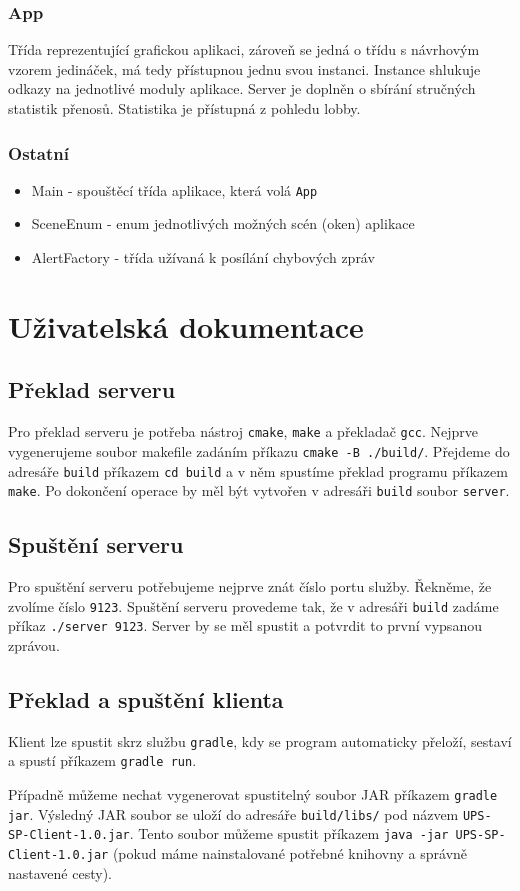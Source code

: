 \documentclass[12pt, a4paper]{article} %
\begin{document}
	\subsubsection{App}
	\par Třída reprezentující grafickou aplikaci, zároveň se jedná o třídu s návrhovým vzorem jedináček, má tedy přístupnou jednu svou instanci. Instance shlukuje odkazy na jednotlivé moduly aplikace. Server je doplněn o sbírání stručných statistik přenosů. Statistika je přístupná z pohledu lobby.
	
	\subsubsection{Ostatní}
	\begin{itemize}
		\item Main - spouštěcí třída aplikace, která volá \texttt{App}
		\item SceneEnum - enum jednotlivých možných scén (oken) aplikace
		\item AlertFactory - třída užívaná k posílání chybových zpráv
	\end{itemize}
	
	\section{Uživatelská dokumentace}
	\subsection{Překlad serveru}
	\par Pro překlad serveru je potřeba nástroj \texttt{cmake}, \texttt{make} a překladač \texttt{gcc}. Nejprve vygenerujeme soubor makefile zadáním příkazu \texttt{cmake -B ./build/}. Přejdeme do adresáře \texttt{build} příkazem \texttt{cd build} a v něm spustíme překlad programu příkazem \texttt{make}. Po dokončení operace by měl být vytvořen v adresáři \texttt{build} soubor \texttt{server}. 
	\subsection{Spuštění serveru}
	\par Pro spuštění serveru potřebujeme nejprve znát číslo portu služby. Řekněme, že zvolíme číslo \texttt{9123}. Spuštění serveru provedeme tak, že v adresáři \texttt{build} zadáme příkaz \texttt{./server 9123}. Server by se měl spustit a potvrdit to první vypsanou zprávou.
	\subsection{Překlad a spuštění klienta}
	\par Klient lze spustit skrz službu \texttt{gradle}, kdy se program automaticky přeloží, sestaví a spustí příkazem \texttt{gradle run}.
	\par Případně můžeme nechat vygenerovat spustitelný soubor JAR příkazem \texttt{gradle jar}. Výsledný JAR soubor se uloží do adresáře \texttt{build/libs/} pod názvem \texttt{UPS-SP-Client-1.0.jar}. Tento soubor můžeme spustit příkazem \texttt{java -jar UPS-SP-Client-1.0.jar} (pokud máme nainstalované potřebné knihovny a správně nastavené cesty).
\end{document}
